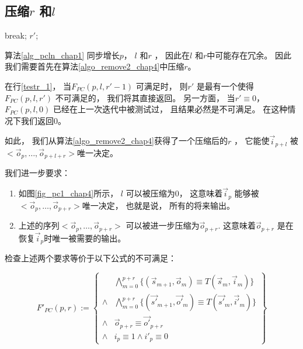 \subsection{压缩$r$ 和$l$}\label{reduceing}

\begin{algorithm}[t]
\begin{algorithmic}[1]
\label{testr_1}
  \STATE  break;
  \ENDIF
\ENDFOR
\RETURN $r'$;
\caption{$RemoveRedundancy(p,l,r)$}
\label{algo_remove2_chap4}
\end{algorithmic}
\end{algorithm}



算法\ref{alg_pcln_chap1} 同步增长$p$， $l$ 和$r$ ，
因此在$l$ 和$r$中可能存在冗余。
因此我们需要首先在算法\ref{algo_remove2_chap4}中压缩$r$。


在行\ref{testr_1}，
当$F_{PC}(p,l,r'-1)$ 可满足时，
则$r'$ 是最有一个使得$F_{PC}(p,l,r')$ 不可满足的，
我们将其直接返回。
另一方面，
当$r'\equiv 0$，
$F_{PC}(p,l,0)$ 已经在上一次迭代中被测试过，
且结果必然是不可满足。
在这种情况下我们返回$0$。


如此，
我们从算法\ref{algo_remove2_chap4}获得了一个压缩后的$r$ ，
它能使$\vec{i}_{p+l}$ 被$<\vec{o}_{p},\dots,\vec{o}_{p+l+r}>$唯一决定。

我们进一步要求：
\begin{enumerate}
 \item 如图\ref{fig_pc1_chap4}所示，
 $l$ 可以被压缩为0，
 这意味着$\vec{i}_{p}$ 能够被$<\vec{o}_{p},\dots,\vec{o}_{p+r}>$唯一决定，
 也就是说，
 所有的将来输出。
 \item 上述的序列$<\vec{o}_{p},\dots,\vec{o}_{p+r}>$
 可以被进一步压缩为$\vec{o}_{p+r}$.
 这意味着$\vec{o}_{p+r}$ 是在恢复$\vec{i}_p$时唯一被需要的输出。
\end{enumerate}

检查上述两个要求等价于以下公式的不可满足：

\begin{equation}\label{uniqt11_chap4}
F'_{PC}(p,r):=
\left\{
\begin{array}{cc}
&\bigwedge_{m=0}^{p+r}
\{
(\vec{s}_{m+1},\vec{o}_m)\equiv T(\vec{s}_m,\vec{i}_m)
\}
\\
\wedge&\bigwedge_{m=0}^{p+r}
\{
(\vec{s'}_{m+1},\vec{o'}_m)\equiv T(\vec{s'}_m,\vec{i'}_m)
\}
\\
\wedge&\vec{o}_{p+r}\equiv \vec{o'}_{p+r} \\
\wedge& i_{p}\equiv 1 \wedge  i'_{p}\equiv 0
\end{array}
\right\}
\end{equation}


